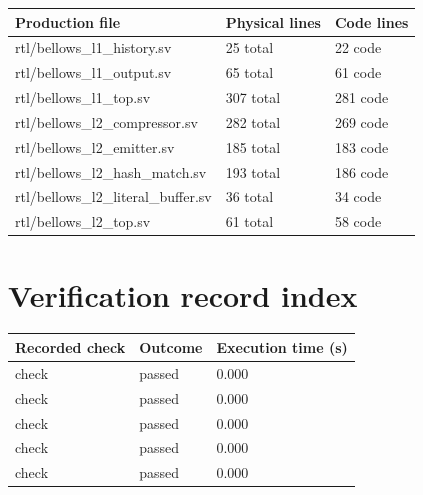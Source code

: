 \documentclass[11pt,a4paper]{article}
\begin{document}
{\small\renewcommand{\arraystretch}{1.18}\begin{longtable}{@{}L{0.55\textwidth}|L{0.18\textwidth}|L{0.18\textwidth}@{}}\toprule

\textbf{Production file} & \textbf{Physical lines} & \textbf{Code lines}\\\midrule\endhead

rtl/\allowbreak{}bellows\_\allowbreak{}l1\_\allowbreak{}history.sv & 25 total & 22 code\\[2pt]\hline

rtl/\allowbreak{}bellows\_\allowbreak{}l1\_\allowbreak{}output.sv & 65 total & 61 code\\[2pt]\hline

rtl/\allowbreak{}bellows\_\allowbreak{}l1\_\allowbreak{}top.sv & 307 total & 281 code\\[2pt]\hline

rtl/\allowbreak{}bellows\_\allowbreak{}l2\_\allowbreak{}compressor.sv & 282 total & 269 code\\[2pt]\hline

rtl/\allowbreak{}bellows\_\allowbreak{}l2\_\allowbreak{}emitter.sv & 185 total & 183 code\\[2pt]\hline

rtl/\allowbreak{}bellows\_\allowbreak{}l2\_\allowbreak{}hash\_\allowbreak{}match.sv & 193 total & 186 code\\[2pt]\hline

rtl/\allowbreak{}bellows\_\allowbreak{}l2\_\allowbreak{}literal\_\allowbreak{}buffer.sv & 36 total & 34 code\\[2pt]\hline

rtl/\allowbreak{}bellows\_\allowbreak{}l2\_\allowbreak{}top.sv & 61 total & 58 code\\[2pt]\hline

\bottomrule\end{longtable}}

\section{Verification record index}

{\small\renewcommand{\arraystretch}{1.18}\begin{longtable}{@{}L{0.57\textwidth}|L{0.16\textwidth}|L{0.17\textwidth}@{}}\toprule

\textbf{Recorded check} & \textbf{Outcome} & \textbf{Execution time (\allowbreak{}s)\allowbreak{}}\\\midrule\endhead

check & passed & 0.000\\[2pt]\hline

check & passed & 0.000\\[2pt]\hline

check & passed & 0.000\\[2pt]\hline

check & passed & 0.000\\[2pt]\hline

check & passed & 0.000\\[2pt]\hline

\bottomrule\end{longtable}}
\end{document}
